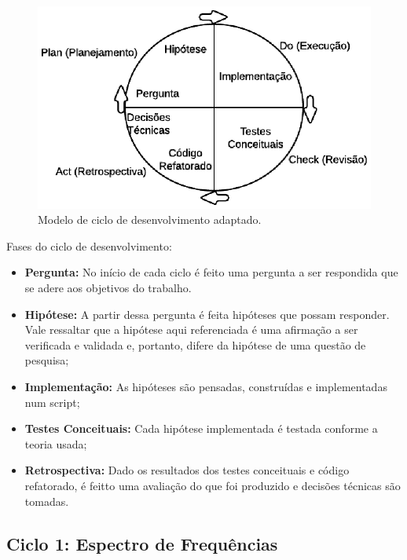 \begin{figure}[h] 
  \centering
    \includegraphics[keepaspectratio=true, scale=0.85]{figuras/ciclo_desenvolvimento}
    \caption{Modelo de ciclo de desenvolvimento adaptado.}
\end{figure}

Fases do ciclo de desenvolvimento:
\begin{itemize}
\item \textbf{Pergunta:} No início de cada ciclo é feito uma pergunta a ser respondida que se adere aos objetivos do trabalho.
\item \textbf{Hipótese:} A partir dessa pergunta é feita hipóteses que possam responder. Vale ressaltar que a hipótese aqui referenciada é uma afirmação a ser verificada e validada e, portanto, difere da hipótese de uma questão de pesquisa;
\item \textbf{Implementação:} As hipóteses são pensadas, construídas e implementadas num script;
\item \textbf{Testes Conceituais:} Cada hipótese implementada é testada conforme a teoria usada;
\item \textbf{Retrospectiva:} Dado os resultados dos testes conceituais e código refatorado, é feitto uma avaliação do que foi produzido e decisões técnicas são tomadas.
\end{itemize}
  
\subsection{Ciclo 1: Espectro de Frequências}
\label{subsec:ciclo_1}

